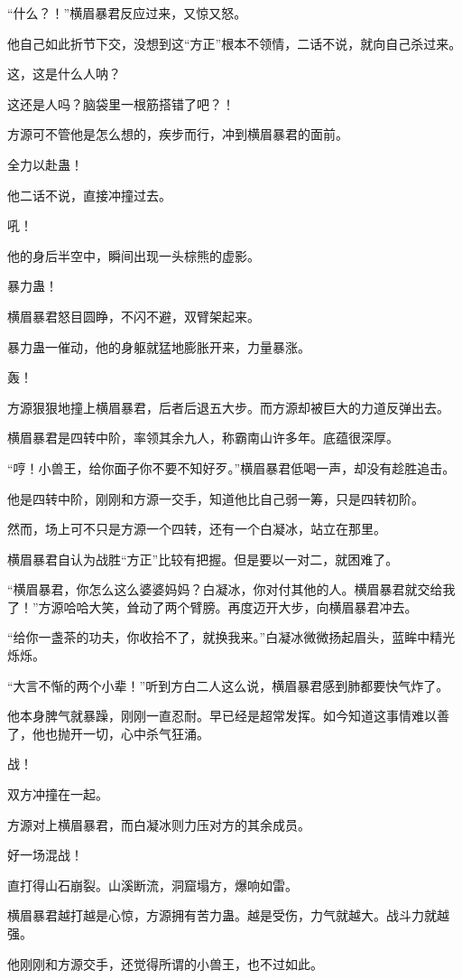 \begin{this_body}
“什么？！”横眉暴君反应过来，又惊又怒。

他自己如此折节下交，没想到这“方正”根本不领情，二话不说，就向自己杀过来。

这，这是什么人呐？

这还是人吗？脑袋里一根筋搭错了吧？！

方源可不管他是怎么想的，疾步而行，冲到横眉暴君的面前。

全力以赴蛊！

他二话不说，直接冲撞过去。

吼！

他的身后半空中，瞬间出现一头棕熊的虚影。

暴力蛊！

横眉暴君怒目圆睁，不闪不避，双臂架起来。

暴力蛊一催动，他的身躯就猛地膨胀开来，力量暴涨。

轰！

方源狠狠地撞上横眉暴君，后者后退五大步。而方源却被巨大的力道反弹出去。

横眉暴君是四转中阶，率领其余九人，称霸南山许多年。底蕴很深厚。

“哼！小兽王，给你面子你不要不知好歹。”横眉暴君低喝一声，却没有趁胜追击。

他是四转中阶，刚刚和方源一交手，知道他比自己弱一筹，只是四转初阶。

然而，场上可不只是方源一个四转，还有一个白凝冰，站立在那里。

横眉暴君自认为战胜“方正”比较有把握。但是要以一对二，就困难了。

“横眉暴君，你怎么这么婆婆妈妈？白凝冰，你对付其他的人。横眉暴君就交给我了！”方源哈哈大笑，耸动了两个臂膀。再度迈开大步，向横眉暴君冲去。

“给你一盏茶的功夫，你收拾不了，就换我来。”白凝冰微微扬起眉头，蓝眸中精光烁烁。

“大言不惭的两个小辈！”听到方白二人这么说，横眉暴君感到肺都要快气炸了。

他本身脾气就暴躁，刚刚一直忍耐。早已经是超常发挥。如今知道这事情难以善了，他也抛开一切，心中杀气狂涌。

战！

双方冲撞在一起。

方源对上横眉暴君，而白凝冰则力压对方的其余成员。

好一场混战！

直打得山石崩裂。山溪断流，洞窟塌方，爆响如雷。

横眉暴君越打越是心惊，方源拥有苦力蛊。越是受伤，力气就越大。战斗力就越强。

他刚刚和方源交手，还觉得所谓的小兽王，也不过如此。


\end{this_body}
